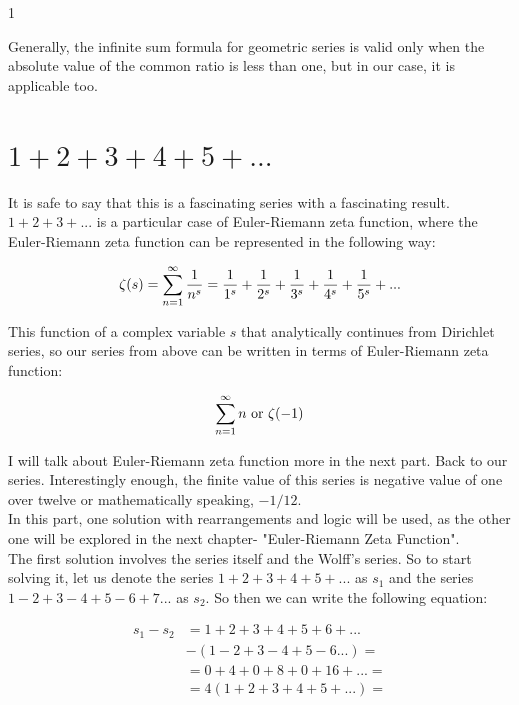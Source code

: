 1\documentclass[a4paper]{article}
\begin{document}
Generally, the infinite sum formula for geometric series is valid only when the absolute value
of the common ratio is less than one, but in our case, it is applicable too.
\newpage
\section {$1+2+3+4+5+...$}

It is safe to say that this is a fascinating series with a fascinating result. $1+2+3+...$ is a particular
case of Euler-Riemann zeta function, where the Euler-Riemann zeta function can be represented in
the following way:

\begin{equation}
  \zeta(s)=\sum_{n=1}^{\infty} \frac{1}{n^s}=\frac{1}{1^s}+\frac{1}{2^s}+\frac{1}{3^s}+
  \frac{1}{4^s}+\frac{1}{5^s}+...\\
  \label{zetaf}
\end{equation}

This function of a complex variable $s$ that analytically continues from Dirichlet series, so our series
from above can be written in terms of Euler-Riemann zeta function:

\begin{equation}
  \sum_{n=1}^{\infty} n \text{ or } \zeta(-1)\\
  \end{equation}

I will talk about Euler-Riemann zeta function more in the next part. Back to our series. Interestingly enough,
the finite value of this series is negative value of one over twelve or mathematically speaking,
$-1/12$.\\

In this part, one solution with rearrangements and logic will be used, as the other one will be
explored in the next chapter- "Euler-Riemann Zeta Function".\\

The first solution involves the series itself and the Wolff's series. So to start solving it, let us denote
the series $1+2+3+4+5+...$ as $s_1$ and the series $1-2+3-4+5-6+7...$ as $s_2$. So then
we can write the following equation:

\begin{align*}
  s_1-s_2&=1+2+3+4+5+6+...\\
  &-(1-2+3-4+5-6...)=\\
  &=0+4+0+8+0+16+...=\\
  &=4(1+2+3+4+5+...)=
\end{align*}
\end{document}
